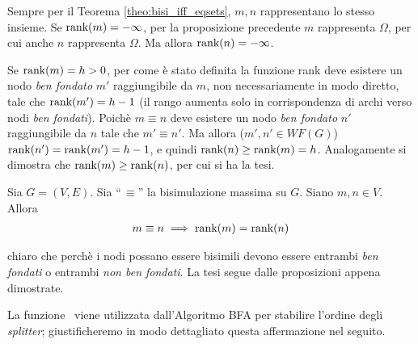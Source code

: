 \begin{proof2}
    Sempre per il Teorema \ref{theo:bisi_iff_eqsets}, $m,n$ rappresentano lo stesso insieme. Se $\textup{rank}(m) = -\infty$, per la proposizione precedente $m$ rappresenta $\Omega$, per cui anche $n$ rappresenta $\Omega$. Ma allora $\textup{rank}(n) = -\infty$.

    Se $\textup{rank}(m) = h > 0$, per come è stato definita la funzione rank deve esistere un nodo \emph{ben fondato} $m'$ raggiungibile da $m$, non necessariamente in modo diretto, tale che $\textup{rank}(m') = h-1$ (il rango aumenta solo in corrispondenza di archi verso nodi \emph{ben fondati}). Poichè $m \equiv n$ deve esistere un nodo \emph{ben fondato} $n'$ raggiungibile da $n$ tale che $m' \equiv n'$. Ma allora ($m',n' \in WF(G)$) $\textup{rank}(n') = \textup{rank}(m') = h-1$, e quindi $\textup{rank}(n) \geq \textup{rank}(m) = h$. Analogamente si dimostra che $\textup{rank}(m) \geq \textup{rank}(n)$, per cui si ha la tesi.
\end{proof2}
\begin{theorem}
    \label{theo:bisi_rank}
    Sia $G = (V,E)$. Sia ``\,$\equiv$'' la bisimulazione massima su $G$. Siano $m,n \in V$. Allora
    \begin{gather*}
        m \equiv n \implies \textup{rank}(m) = \textup{rank}(n)
    \end{gather*}
\end{theorem}
\begin{proof2}
    \accente chiaro che perchè i nodi possano essere bisimili devono essere entrambi \emph{ben fondati} o entrambi \emph{non ben fondati}. La tesi segue dalle proposizioni appena dimostrate.
\end{proof2}
La funzione \rankfunc \, viene utilizzata dall'Algoritmo BFA per stabilire l'ordine degli \emph{splitter}; giustificheremo in modo dettagliato questa affermazione nel seguito.

